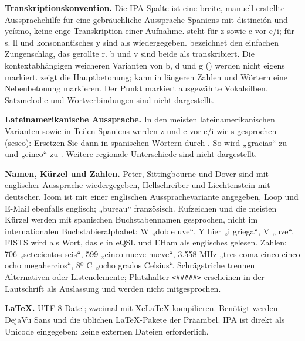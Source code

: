 \documentclass[a4paper,landscape,10pt]{article}
\newcommand{\ipa}[1]{{\ipafont[#1]}}
\begin{document}
\smallskip
\textbf{Transkriptionskonvention.} Die IPA-Spalte ist eine breite, manuell erstellte Aussprachehilfe
für eine gebräuchliche Aussprache Spaniens mit distinción und yeísmo, keine enge Transkription einer Aufnahme.
\ipa{θ} steht für z sowie c vor e/i; \ipa{s} für s. ll und konsonantisches y sind als \ipa{ʝ} wiedergegeben.
\ipa{ɾ} bezeichnet den einfachen Zungenschlag, \ipa{r} das gerollte r. b und v sind beide als \ipa{b}
transkribiert. Die kontextabhängigen weicheren Varianten von b, d und g (\ipa{β, ð, ɣ}) werden nicht eigens
markiert. \ipa{ˈ} zeigt die Hauptbetonung; \ipa{ˌ} kann in längeren Zahlen und Wörtern eine Nebenbetonung markieren.
Der Punkt markiert ausgewählte Vokalsilben. Satzmelodie und Wortverbindungen sind nicht dargestellt.

\smallskip
\textbf{Lateinamerikanische Aussprache.} In den meisten lateinamerikanischen Varianten sowie in Teilen Spaniens
werden z und c vor e/i wie s gesprochen (seseo): Ersetzen Sie dann in spanischen Wörtern \ipa{θ} durch \ipa{s}.
So wird „gracias“ zu \ipa{ˈɡɾasjas} und „cinco“ zu \ipa{ˈsinko}. Weitere regionale Unterschiede sind nicht dargestellt.

\smallskip
\textbf{Namen, Kürzel und Zahlen.} Peter, Sittingbourne und Dover sind mit englischer Aussprache wiedergegeben,
Hellschreiber und Liechtenstein mit deutscher. Icom ist mit einer englischen Aussprachevariante angegeben,
Loop und E-Mail ebenfalls englisch; „bureau“ französisch. Rufzeichen und die meisten Kürzel werden mit
spanischen Buchstabennamen gesprochen, nicht im internationalen Buchstabieralphabet: W „doble uve“,
Y hier „i griega“, V „uve“. FISTS wird als Wort, das e in eQSL und EHam als englisches \ipa{i} gelesen.
Zahlen: 706 „setecientos seis“, 599 „cinco nueve nueve“, 3.558 MHz
„tres coma cinco cinco ocho megahercios“, 8º C „ocho grados Celsius“.
Schrägstriche trennen Alternativen oder Listenelemente; Platzhalter \texttt{<\#\#\#\#\#>}
erscheinen in der Lautschrift als Auslassung und werden nicht mitgesprochen.

\smallskip
\textbf{LaTeX.} UTF-8-Datei; zweimal mit XeLaTeX kompilieren. Benötigt werden DejaVu Sans und die
üblichen LaTeX-Pakete der Präambel. IPA ist direkt als Unicode eingegeben; keine externen Dateien erforderlich.
\end{document}
